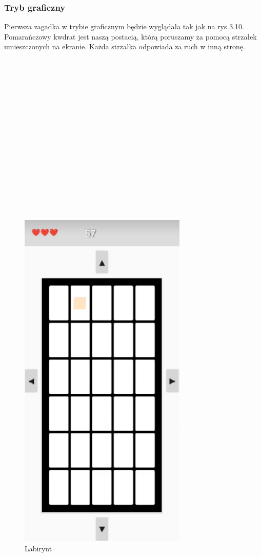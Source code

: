\subsubsection{Tryb graficzny}
Pierwsza zagadka w trybie graficznym będzie wyglądała tak jak na rys 3.10.
Pomarańczowy kwdrat jest naszą postacią, którą poruszamy za pomocą strzałek umieszczonych na ekranie.
Każda strzałka odpowiada za ruch w inną stronę.
\\
\\
\\
\\
\\
\\
\\
\\
\\
\\
\\
\\
\\
\\
\\
\\
\\
	\begin{figure}[!htb]
	\begin{center}
		\includegraphics[width=8cm]{rys/gra7.png}
		\caption{Labirynt}
		\label{rys:rysunek001}
	\end{center}
\end{figure}
